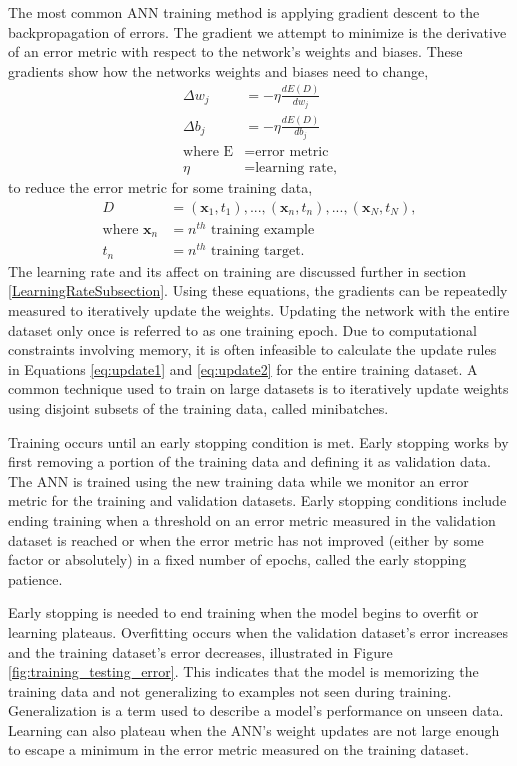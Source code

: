 The most common ANN training method is applying gradient descent to the backpropagation of errors. The gradient we attempt to minimize is the derivative of an error metric with respect to the network's weights and biases. These gradients show how the networks weights and biases need to change,
%
\begin{align}
\Delta w_{j} &= - \eta \frac{dE(D)}{dw_j} \label{eq:update1} \\
\Delta b_{j} &= - \eta \frac{dE(D)}{db_j} \label{eq:update2} \\
\text{where E} &= \text{error metric} \nonumber \\
\eta &= \text{learning rate,} \nonumber
\end{align}
to reduce the error metric for some training data,
%
\begin{align} \label{eq:train_data_D}
D&={(\boldsymbol{x}_1,t_1), ... , (\boldsymbol{x}_n,t_n), ... , (\boldsymbol{x}_N,t_N)}, \\
\text{where } \boldsymbol{x}_{n} &= n^{th} \text{ training example} \nonumber \\
t_n &= n^{th} \text{ training target.} \nonumber
\end{align}
%
The learning rate and its affect on training are discussed further in section \ref{LearningRateSubsection}. Using these equations, the gradients can be repeatedly measured to iteratively update the weights. Updating the network with the entire dataset only once is referred to as one training epoch. Due to computational constraints involving memory, it is often infeasible to calculate the update rules in Equations \ref{eq:update1} and \ref{eq:update2} for the entire training dataset. A common technique used to train on large datasets is to iteratively update weights using disjoint subsets of the training data, called minibatches.

Training occurs until an early stopping condition is met. Early stopping works by first removing a portion of the training data and defining it as validation data. The ANN is trained using the new training data while we monitor an error metric for the training and validation datasets. Early stopping conditions include ending training when a threshold on an error metric measured in the validation dataset is reached or when the error metric has not improved (either by some factor or absolutely) in a fixed number of epochs, called the early stopping patience. 

Early stopping is needed to end training when the model begins to overfit or learning plateaus. Overfitting occurs when the validation dataset's error increases and the training dataset's error decreases, illustrated in Figure \ref{fig:training_testing_error}. This indicates that the model is memorizing the training data and not generalizing to examples not seen during training. Generalization is a term used to describe a model's performance on unseen data. Learning can also plateau when the ANN's weight updates are not large enough to escape a minimum in the error metric measured on the training dataset.

